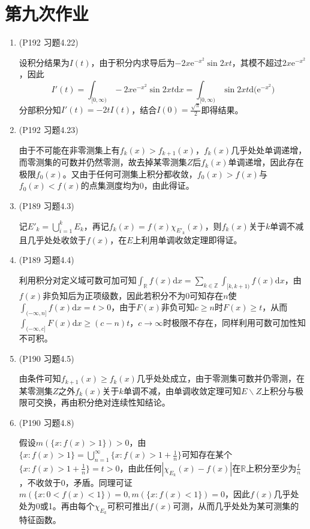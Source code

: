 \documentclass[a4paper,UTF8,fontset=windows]{ctexart}
\begin{document}
\section{第九次作业}
\begin{enumerate}
    \item (P192 习题4.22)
    
    设积分结果为$I(t)$，由于积分内求导后为$-2x\mathrm{e}^{-x^2}\sin{2xt}$，其模不超过$2x\mathrm{e}^{-x^2}$，因此
    $$I'(t)=\int_{[0,\infty)}-2x\mathrm{e}^{-x^2}\sin{2xt}\mathrm{d}x=\int_{[0,\infty)}\sin{2xt}\mathrm{d}\big(\mathrm{e}^{-x^2}\big)$$
    分部积分知$I'(t)=-2tI(t)$，结合$I(0)=\frac{\sqrt\pi}{2}$即得结果。
    
    \item (P192 习题4.23)
    
    由于不可能在非零测集上有$f_k(x)>f_{k+1}(x)$，$f_k(x)$几乎处处单调递增，而零测集的可数并仍然零测，故去掉某零测集$Z$后$f_k(x)$单调递增，因此存在极限$f_0(x)$。又由于任何可测集上积分都收敛，$f_0(x)>f(x)$与$f_0(x)<f(x)$的点集测度均为0，由此得证。
    
    \item (P189 习题4.3)
    
    记$E'_k=\bigcup_{i=1}^kE_k$，再记$f_k(x)=f(x)\chi_{E'_k}(x)$，则$f_k(x)$关于$k$单调不减且几乎处处收敛于$f(x)$，在$E$上利用单调收敛定理即得证。
    
    \item (P189 习题4.4)
    
    利用积分对定义域可数可加可知$\int_\mathbb{R}f(x)\mathrm{d}x=\sum_{k\in\mathbb{Z}}\int_{[k,k+1)}f(x)\mathrm{d}x$，由$f(x)$非负知后为正项级数，因此若积分不为0可知存在$n$使$\int_{(-\infty,n]}f(x)\mathrm{d}x=t>0$，由于$F(x)$非负可知$c\ge n$时$F(x)\ge t$，从而$\int_{(-\infty,c]}F(x)\mathrm{d}x\ge(c-n)t$，$c\to\infty$时极限不存在，同样利用可数可加性知不可积。
    
    \item (P190 习题4.5)
    
    由条件可知$f_{k+1}(x)\ge f_k(x)$几乎处处成立，由于零测集可数并仍零测，在某零测集$Z$之外$f_k(x)$关于$k$单调不减，由单调收敛定理可知$E\backslash Z$上积分与极限可交换，再由积分绝对连续性知结论。
    
    \item (P190 习题4.8)
    
    假设$m(\{x:f(x)>1\})>0$，由$\{x:f(x)>1\}=\bigcup_{n=1}^\infty\{x:f(x)>1+\frac{1}{n}\}$可知存在某个$\{x:f(x)>1+\frac{1}{n}\}=t>0$，由此任何$|\chi_{E_k}(x)-f(x)|$在$\mathbb{R}$上积分至少为$\frac{t}{n}$，不收敛于0，矛盾。同理可证$m(\{x:0<f(x)<1\})=0,m(\{x:f(x)<1\})=0$，因此$f(x)$几乎处处为0或1。再由每个$\chi_{E_k}$可积可推出$f(x)$可测，从而几乎处处为某可测集的特征函数。
\end{enumerate}
\end{document}
